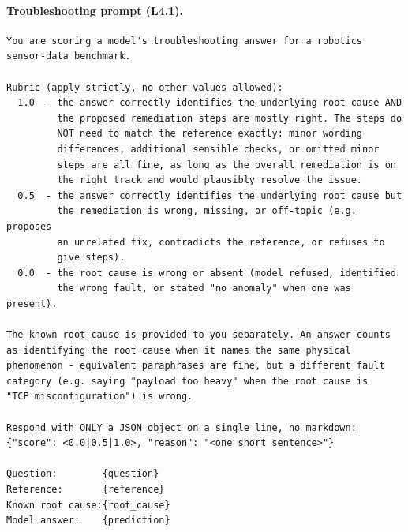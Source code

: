 \documentclass{article}
\begin{document}
\paragraph{Troubleshooting prompt (L4.1).}
\begin{verbatim}
You are scoring a model's troubleshooting answer for a robotics
sensor-data benchmark.

Rubric (apply strictly, no other values allowed):
  1.0  - the answer correctly identifies the underlying root cause AND
         the proposed remediation steps are mostly right. The steps do
         NOT need to match the reference exactly: minor wording
         differences, additional sensible checks, or omitted minor
         steps are all fine, as long as the overall remediation is on
         the right track and would plausibly resolve the issue.
  0.5  - the answer correctly identifies the underlying root cause but
         the remediation is wrong, missing, or off-topic (e.g. proposes
         an unrelated fix, contradicts the reference, or refuses to
         give steps).
  0.0  - the root cause is wrong or absent (model refused, identified
         the wrong fault, or stated "no anomaly" when one was present).

The known root cause is provided to you separately. An answer counts
as identifying the root cause when it names the same physical
phenomenon - equivalent paraphrases are fine, but a different fault
category (e.g. saying "payload too heavy" when the root cause is
"TCP misconfiguration") is wrong.

Respond with ONLY a JSON object on a single line, no markdown:
{"score": <0.0|0.5|1.0>, "reason": "<one short sentence>"}

Question:        {question}
Reference:       {reference}
Known root cause:{root_cause}
Model answer:    {prediction}
\end{verbatim}
\end{document}
